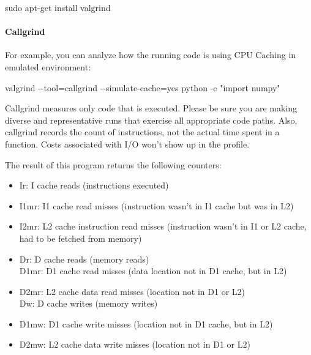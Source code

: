 \documentclass[
]{article}
\newenvironment{Shaded}{}{}
\newcommand{\AttributeTok}[1]{\textcolor[rgb]{0.49,0.56,0.16}{#1}}
\newcommand{\FunctionTok}[1]{\textcolor[rgb]{0.02,0.16,0.49}{#1}}
\newcommand{\NormalTok}[1]{#1}
\newcommand{\OperatorTok}[1]{\textcolor[rgb]{0.40,0.40,0.40}{#1}}
\newcommand{\StringTok}[1]{\textcolor[rgb]{0.25,0.44,0.63}{#1}}
\begin{document}
\begin{Shaded}
\begin{Highlighting}[]
\FunctionTok{sudo}\NormalTok{  apt{-}get install valgrind}
\end{Highlighting}
\end{Shaded}

\hypertarget{callgrind}{%
\paragraph{Callgrind}\label{callgrind}}

For example, you can analyze how the running code is using CPU Caching
in emulated environment:

\begin{Shaded}
\begin{Highlighting}[]
\FunctionTok{valgrind} \AttributeTok{{-}{-}tool}\OperatorTok{=}\NormalTok{callgrind }\AttributeTok{{-}{-}simulate{-}cache}\OperatorTok{=}\NormalTok{yes python }\AttributeTok{{-}c} \StringTok{"import numpy"}
\end{Highlighting}
\end{Shaded}

Callgrind measures only code that is executed. Please be sure you are
making diverse and representative runs that exercise all appropriate
code paths. Also, callgrind records the count of instructions, not the
actual time spent in a function. Costs associated with I/O won't show up
in the profile.

The result of this program returns the following counters:

\begin{itemize}
\item
  Ir: I cache reads (instructions executed)
\item
  I1mr: I1 cache read misses (instruction wasn't in I1 cache but was in
  L2)
\item
  I2mr: L2 cache instruction read misses (instruction wasn't in I1 or L2
  cache, had to be fetched from memory)
\item
  Dr: D cache reads (memory reads)\\
  D1mr: D1 cache read misses (data location not in D1 cache, but in L2)
\item
  D2mr: L2 cache data read misses (location not in D1 or L2)\\
  Dw: D cache writes (memory writes)
\item
  D1mw: D1 cache write misses (location not in D1 cache, but in L2)
\item
  D2mw: L2 cache data write misses (location not in D1 or L2)
\end{itemize}
\end{document}
